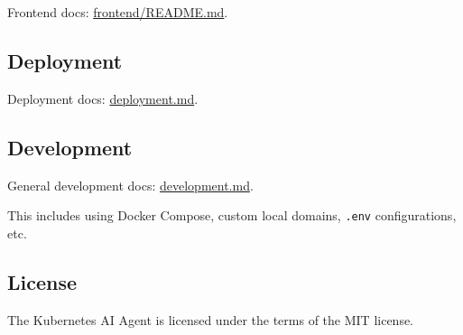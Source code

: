 \documentclass[
]{article}
\begin{document}
Frontend docs: \href{./frontend/README.md}{frontend/README.md}.

\hypertarget{deployment}{%
\subsection{Deployment}\label{deployment}}

Deployment docs: \href{./deployment.md}{deployment.md}.

\hypertarget{development}{%
\subsection{Development}\label{development}}

General development docs: \href{./development.md}{development.md}.

This includes using Docker Compose, custom local domains, \texttt{.env}
configurations, etc.

\hypertarget{license}{%
\subsection{License}\label{license}}

The Kubernetes AI Agent is licensed under the terms of the MIT license.
\end{document}

